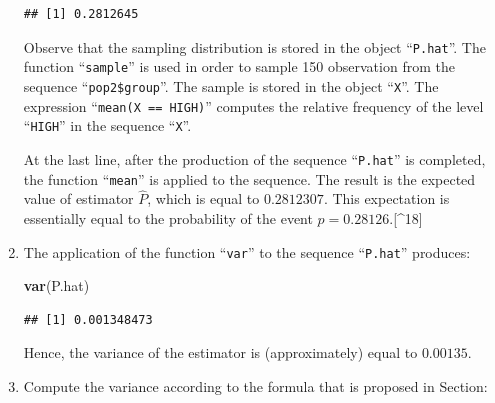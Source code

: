 \documentclass[
]{krantz}
\makeatletter
\newenvironment{Shaded}{\begin{snugshade}}{\end{snugshade}}
\newcommand{\ControlFlowTok}[1]{\textcolor[rgb]{0.13,0.29,0.53}{\textbf{#1}}}
\newcommand{\DecValTok}[1]{\textcolor[rgb]{0.00,0.00,0.81}{#1}}
\newcommand{\KeywordTok}[1]{\textcolor[rgb]{0.13,0.29,0.53}{\textbf{#1}}}
\newcommand{\NormalTok}[1]{#1}
\newcommand{\OperatorTok}[1]{\textcolor[rgb]{0.81,0.36,0.00}{\textbf{#1}}}
\newcommand{\StringTok}[1]{\textcolor[rgb]{0.31,0.60,0.02}{#1}}
\newenvironment{kframe}{%
\medskip{}
\setlength{\fboxsep}{.8em}
 \def\at@end@of@kframe{}%
 \ifinner\ifhmode%
  \def\at@end@of@kframe{\end{minipage}}%
  \begin{minipage}{\columnwidth}%
 \fi\fi%
 \def\FrameCommand##1{\hskip\@totalleftmargin \hskip-\fboxsep
 \colorbox{shadecolor}{##1}\hskip-\fboxsep
     \hskip-\linewidth \hskip-\@totalleftmargin \hskip\columnwidth}%
 \MakeFramed {\advance\hsize-\width
   \@totalleftmargin\z@ \linewidth\hsize
   \@setminipage}}%
 {\par\unskip\endMakeFramed%
 \at@end@of@kframe}
\renewenvironment{Shaded}{\begin{kframe}}{\end{kframe}}
\theoremstyle{definition}
\theoremstyle{definition}
\theoremstyle{definition}
\theoremstyle{remark}
\makeatother
\begin{document}
\begin{enumerate}
\begin{Shaded}
\end{Shaded}

\begin{verbatim}
## [1] 0.2812645
\end{verbatim}

  Observe that the sampling distribution is stored in the object
  ``\texttt{P.hat}''. The function ``\texttt{sample}'' is used in order to sample 150
  observation from the sequence ``\texttt{pop2\$group}''. The sample is stored in
  the object ``\texttt{X}''. The expression ``\texttt{mean(X\ ==\ HIGH)}'' computes the
  relative frequency of the level ``\texttt{HIGH}'' in the sequence ``\texttt{X}''.

  At the last line, after the production of the sequence ``\texttt{P.hat}'' is
  completed, the function ``\texttt{mean}'' is applied to the sequence. The result
  is the expected value of estimator \(\hat P\), which is equal to
  \(0.2812307\). This expectation is essentially equal to the probability of
  the event \(p = 0.28126\).{[}\^{}18{]}
\item
  The application of the function
  ``\texttt{var}'' to the sequence ``\texttt{P.hat}'' produces:

\begin{Shaded}
\begin{Highlighting}[]
\KeywordTok{var}\NormalTok{(P.hat)}
\end{Highlighting}
\end{Shaded}

\begin{verbatim}
## [1] 0.001348473
\end{verbatim}

  Hence, the variance of the estimator is (approximately) equal to
  \(0.00135\).
\item
  Compute the variance according to
  the formula that is proposed in Section:


\end{enumerate}
\end{document}
